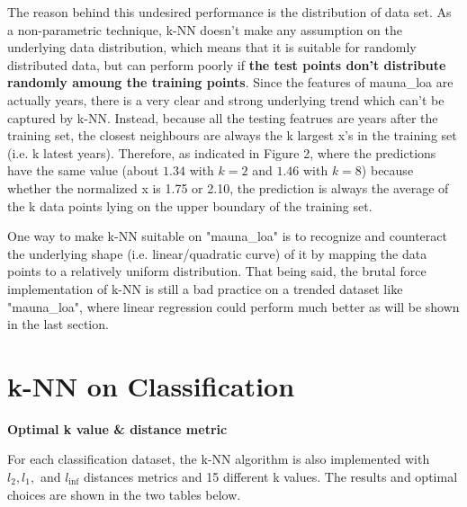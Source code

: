 \documentclass{article} %
\begin{document}
  The reason behind this undesired performance is the distribution of data set. As a non-parametric technique, k-NN doesn't make any assumption on the underlying data distribution, which means that it is suitable for randomly distributed data, but can perform poorly if \textbf{the test points don't distribute randomly amoung the training points}. Since the features of mauna\_loa are actually years, there is a very clear and strong underlying trend which can't be captured by k-NN. Instead, because all the testing featrues are years after the training set, the closest neighbours are always the k largest x's in the training set (i.e. k latest years). Therefore, as indicated in Figure 2, where the predictions have the same value (about $1.34$ with $k=2$ and $1.46$ with $k=8$) because whether the normalized x is 1.75 or 2.10, the prediction is always the average of the k data points lying on the upper boundary of the training set.

  One way to make k-NN suitable on "mauna\_loa" is to recognize and counteract the underlying shape (i.e. linear/quadratic curve) of it by mapping the data points to a relatively uniform distribution. That being said, the brutal force implementation of k-NN is still a bad practice on a trended dataset like "mauna\_loa", where linear regression could perform much better as will be shown in the last section.



\vspace{0.4cm}
\section*{k-NN on Classification} %

\textbf{Optimal k value \& distance metric}

  For each classification dataset, the k-NN algorithm is also implemented with $l_2, l_1,$ and $l_{\inf}$ distances metrics and 15 different k values. The results and optimal choices are shown in the two tables below.
\end{document}

